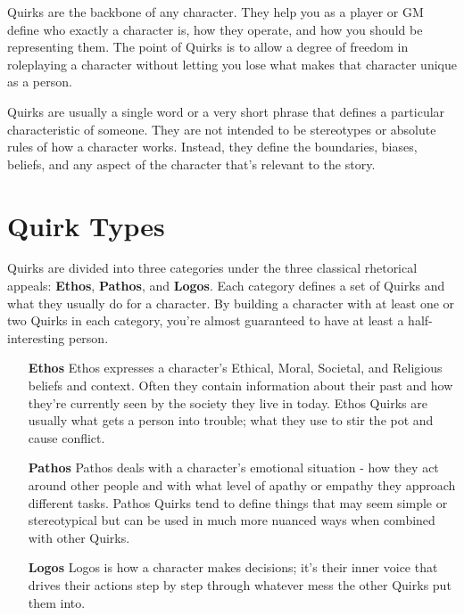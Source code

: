 \documentclass[../main.tex]{subfiles}
\begin{document}
    Quirks are the backbone of any character. They help you as a player or GM define who exactly a character is, how they operate, and how you should be representing them. The point of Quirks is to allow a degree of freedom in roleplaying a character without letting you lose what makes that character unique as a person.

    Quirks are usually a single word or a very short phrase that defines a particular characteristic of someone. They are not intended to be stereotypes or absolute rules of how a character works. Instead, they define the boundaries, biases, beliefs, and any aspect of the character that's relevant to the story.
      
    \section{Quirk Types}

        Quirks are divided into three categories under the three classical rhetorical appeals: \textbf{Ethos}, \textbf{Pathos}, and \textbf{Logos}. Each category defines a set of Quirks and what they usually do for a character. By building a character with at least one or two Quirks in each category, you're almost guaranteed to have at least a half-interesting person.

        \begin{itemize}
            \item [\textbf{Ethos}] Ethos expresses a character's Ethical, Moral, Societal, and Religious beliefs and context. Often they contain information about their past and how they're currently seen by the society they live in today. Ethos Quirks are usually what gets a person into trouble; what they use to stir the pot and cause conflict.
            
            \item [\textbf{Pathos}] Pathos deals with a character's emotional situation - how they act around other people and with what level of apathy or empathy they approach different tasks. Pathos Quirks tend to define things that may seem simple or stereotypical but can be used in much more nuanced ways when combined with other Quirks.
            
            \item [\textbf{Logos}] Logos is how a character makes decisions; it's their inner voice that drives their actions step by step through whatever mess the other Quirks put them into.
        \end{itemize}
\end{document}
